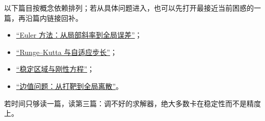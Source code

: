 以下篇目按概念依赖排列；若从具体问题进入，也可以先打开最接近当前困惑的一篇，再沿篇内链接回补。

\begin{itemize}
\tightlist
\item \hyperref[sec:08-Numerical-Analysis/06-ODE/01]{``Euler 方法：从局部斜率到全局误差''}；
\item \hyperref[sec:08-Numerical-Analysis/06-ODE/02]{``Runge--Kutta 与自适应步长''}；
\item \hyperref[sec:08-Numerical-Analysis/06-ODE/03]{``稳定区域与刚性方程''}；
\item \hyperref[sec:08-Numerical-Analysis/06-ODE/04]{``边值问题：从打靶到全局离散''}。
\end{itemize}

若时间只够读一篇，读第三篇：调不好的求解器，绝大多数卡在稳定性而不是精度上。
